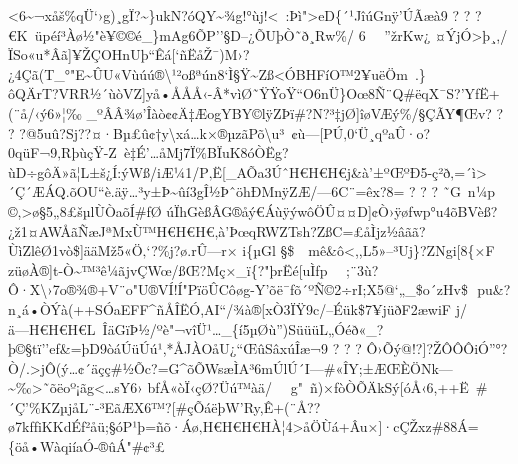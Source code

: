 \textless6\textasciitilde¬xåš\%qÜ`›g­)¸gÏ?\textasciitilde\}ukN?óQY\textasciitilde¾g!°ùj!\textless~:Þì"\textgreater eD\{´¹JîúGnÿ'ÚÃæà9
?  ? 
?€K~üpéí³Àø½"è¥©©é\_\}mAg6Õ\textquotesingle P''§D--¿ÕUþ\textbar Ò˜ð¸Rw\textbar\%/
6    ''žrKw¿
¤ÝjÓ\textgreater þ¸,/ÏSo«u*Âã{]}¥ŽÇOHnUþ``Êá{[}`ñËåŽ¯)M›?¿4\textquotesingle Çã(T\_°"E\textasciitilde ÛU«Vùúú®\textbackslash¹²oßªún8\textbar`Ì§Ÿ\textasciitilde Zß\textlessÓBHFíO™2¥uëÖm~.\}ôQÄrT?VRR½´\textbar ùòV­Z{]}yå•ÅÅÅ‹-Â*vìØ˜ŸŸoŸ``\textquotesingle O6nÜ\}Oœ8Ñ¨Q\#ëqX¯S?'YƒË+(¨å/‹ý6»¦‰
\_º\textbar ÂÂ¾ø'Îàò¢¢Ä‡ÆogYBY©lÿZÞï\#?N?³‡­jØ{]}îøVÆý\%­/§ÇÃY¶Œv?  ?  ? 
?@5uû?Sj??¤·Bµ£û¢†y\textbackslash xá\ldots k×®µzãPõ\textbackslash u³~¢ù---{[}PÚ‚0`Ü¸qºaÛ·o?0qüF¬9‚RþùçŸ-Z~è‡É'\ldotsåMj7Ï\%BÏuK8óÒËg?ùD÷gôÄ»ã¦L±š¿Í:ýWß/iÆ¼1/P‚Ë{[}\_AÕa3ÚˆH€H€H€j\&à'±ºŒºÐ5-ç²ð‚=´ì\textgreater´Ç\textquotesingle´ÆÁQ.õOU``è.äÿ\ldots³y±Þ\textasciitilde ûí3gÎ½ÞˆöhÐMnÿZÆ/---6C¨=êx?8=
?  ?  ?  ˜G~n¼p ©,\textgreater\textbar ø§5„8£šµlÙÒaõÍ\#fØ
úÏhGèßÂG®åý€ÁùÿýwôÖÛ¤¤D{]}¢Ò›ÿøƒwp°u\textbar4õBVèß?¿ž1¤AWÅãÑæJªMxÙ™H€H€H€,\textquotesingle à'ÞœqRWZTsh?ZßC=£åÌjz½âãã?ÙìZlêØ1vò\${]}ääMž5«Ö‚`?\%j?ø.rÛ---r×
i\{µGl §\$   mê\&ô\textless,,L5»--³Uj\}?ZNgi{[}8\{×F
züøÀ®{]}t-Ò\textasciitilde™³ê¼ãjvÇWœ/ßŒ?Mç×\_ï\{?"þrË\textbar é{[}uÌfp  

;¨3ù?Ô·X\textbackslash›7o®¾®+V¨o"U®VÍ!Í"PïöÛCôøg-Y'õë¯fõ´ºÑ©­2÷rI;X5@`„\_\$o´zHv\$

pu\&?n¸á•ÒÝà(++SÓaEFF\^{}\textbar ñÅÎËÓ,AI``/¾à®{[}xÒ3ÏŸ9c/--Éük\$7¥jüðF2æwiF
j/ä---H€H€H€L~ÎäGïÞ½/ºè"¬vîÜ¹\ldots\_\{í5µØù'')SüüüL„Óéð«\_?þ©§tï''ef\&=þD9òáÚüÚú¹,*ÅJÀOåU¿``ŒûSâxúÎæ¬9
?  ?  ? 
Ô›Õý@!?{]}?ŽÔÔÔiÓ''°?Ò/.\textgreater jÔ(ý\ldots¢´äçç\#½Õc?=G\^{}õÕWsæÌA³6mÚlÚ´I---\#«ÎY;±ÆŒÈÖNk---\textasciitilde‰\textgreater˜õëoº¡ãg\textless\ldots sY6›
bfÅ«òÏ‹çØ\textbar?Üú™àä/   
g"~ñ)×fòÒÕÄk\textquotesingle Sý{[}óÅ‹6,++Ë~\#´Ç'\%KZµjåL¨-³EãÆX6™?{[}\#çÕáëþW'Ry,Ê+(¨Å??ø7kfƒiKKdÉƒ²åü;§óP¹þ=ñõ·Áø‚H€H€H€HÀ¦4\textgreater åÖÙá+Âu×{]}·cÇŽx z\#88Á=\{ö\textbar å•WàqiíaÓ-®ûÁ\textbar"\#¢³£


